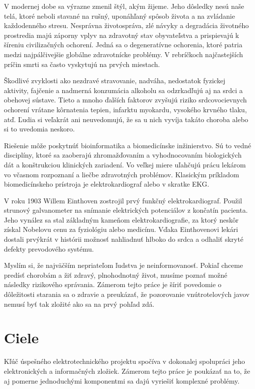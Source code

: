 \documentclass[titlepage]{article}
\begin{document}
V modernej dobe sa výrazne zmenil štýl, akým žijeme. Jeho dôsledky nesú naše telá, ktoré neboli stavané na rušný, uponáhľaný spôsob života a na zvládanie každodenného stresu. Nesprávna životospráva, zlé návyky a degradácia životného prostredia majú záporny vplyv na zdravotný stav obyvateľstva a prispievajú k šíreniu civilizačných ochorení. Jedná sa o degeneratívne ochorenia, ktoré patria medzi najpálčivejšie globálne zdravotnícke problémy. V rebríčkoch najčastejších príčin smrti sa často vyskytujú na prvých miestach.

Škodlivé zvyklosti ako nezdravé stravovanie, nadváha, nedostatok fyzickej aktivity, fajčenie a nadmerná konzumácia alkoholu sa odzrkadľujú aj na srdci a obehovej sústave. Tieto a mnoho ďalších faktorov zvyšujú riziko srdcovocievnych ochorení vrátane kôrnatenia tepien, infarktu myokardu, vysokého krvného tlaku, atď. Ľudia si veľakrát ani neuvedomujú, že sa u nich vyvíja takáto choroba alebo si to uvedomia neskoro.

Riešenie môže poskytnúť bioinformatika a biomedicínske inžinierstvo. Sú to vedné disciplíny, ktoré sa zaoberajú zhromažďovaním a vyhodnocovaním biologických dát a konštrukciou klinických zariadení. Vo veľkej miere uľahčujú prácu lekárom vo včasnom rozpoznaní a liečbe zdravotných problémov. Klasickým príkladom biomedicínskeho prístroja je elektrokardiograf alebo v skratke EKG. 

V roku 1903 Willem Einthoven zostrojil prvý funkčný elektrokardiograf. Použil strunový galvanometer na snímanie elektrických potenciálov z končatín pacienta. Jeho vynález sa stal základným kameňom elektrokardiografie, za ktorý neskôr získal Nobelovu cenu za fyziológiu alebo medicínu. Vďaka Einthovenovi lekári dostali prvýkrát v histórii možnosť nahliadnuť hlboko do srdca a odhaliť skryté defekty prevodového systému.

Myslím si, že najväčším nepriateľom ľudstva je neinformovanosť. Pokiaľ chceme predísť chorobám a žiť zdravý, plnohodnotný život, musíme poznať možné následky rizikového správania. Zámerom tejto práce je šíriť povedomie o dôležitosti starania sa o zdravie a preukázať, že pozorovanie vnútrotelových javov nemusí byť tak zložité ako sa na prvý pohľad zdá. 



\newpage
\section{Ciele}
Kľúč úspešného elektrotechnického projektu spočíva v dokonalej spolupráci jeho elektronických a informačných zložiek. Zámerom tejto práce je poukázať na to, že aj pomerne jednoduchými komponentmi sa dajú vyriešiť komplexné problémy. 
\end{document}
